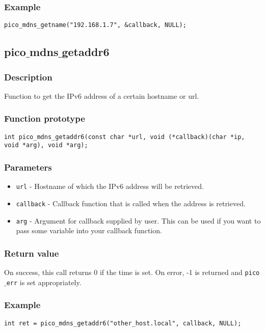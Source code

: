 \subsubsection*{Example}
\begin{verbatim}
pico_mdns_getname("192.168.1.7", &callback, NULL);
\end{verbatim}


\subsection{pico$\_$mdns$\_$getaddr6}

\subsubsection*{Description}
Function to get the IPv6 address of a certain hostname or url.

\subsubsection*{Function prototype}
\begin{verbatim}
int pico_mdns_getaddr6(const char *url, void (*callback)(char *ip, void *arg), void *arg);
\end{verbatim}

\subsubsection*{Parameters}
\begin{itemize}[noitemsep]
\item \texttt{url} - Hostname of which the IPv6 address will be retrieved.
\item \texttt{callback} - Callback function that is called when the address is retrieved.
\item \texttt{arg} - Argument for callback supplied by user. This can be used if you want to pass some variable into your callback function.
\end{itemize}

\subsubsection*{Return value}
On success, this call returns 0 if the time is set.
On error, -1 is returned and \texttt{pico$\_$err} is set appropriately.

\subsubsection*{Example}
\begin{verbatim}
int ret = pico_mdns_getaddr6("other_host.local", callback, NULL);
\end{verbatim}



